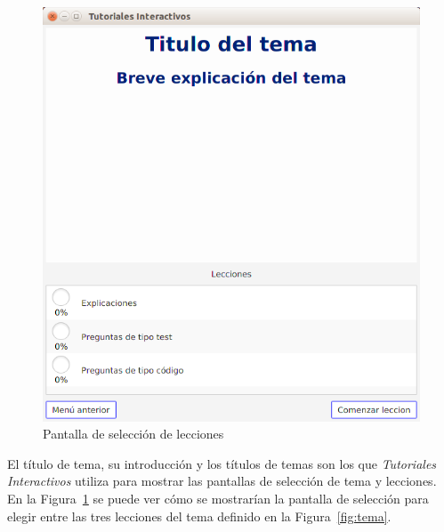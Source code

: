 \documentclass[]{article}
\newcommand{\toolname}{\emph{Tutoriales Interactivos}}
\begin{document}
\begin{figure}[tb]
	\centerline{\includegraphics[scale=0.4]{lecciones}}
	\caption{Pantalla de selección de lecciones\label{fig:lecciones}}
\end{figure}

El título de tema, su introducción y los títulos de temas son los que \toolname{} utiliza para mostrar las pantallas de selección de tema y lecciones. En la Figura~\ref{fig:lecciones} se puede ver cómo se mostrarían la pantalla de selección para elegir entre las tres lecciones del tema definido en la Figura~\ref{fig:tema}.
\end{document}
